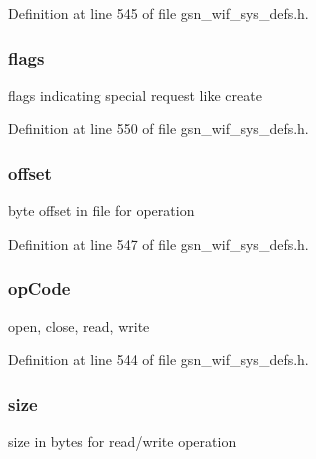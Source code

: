 Definition at line 545 of file gsn\_\-wif\_\-sys\_\-defs.h.

\hypertarget{a00350_a5a821be372043cabb6e452c3ce9bc068}{
\subsubsection[{flags}]{ {\bf flags}}}
\label{a00350_a5a821be372043cabb6e452c3ce9bc068}
flags indicating special request like create 

Definition at line 550 of file gsn\_\-wif\_\-sys\_\-defs.h.

\hypertarget{a00350_af7c1ea69079dc905761ed0a19ec036ab}{
\subsubsection[{offset}]{ {\bf offset}}}
\label{a00350_af7c1ea69079dc905761ed0a19ec036ab}
byte offset in file for operation 

Definition at line 547 of file gsn\_\-wif\_\-sys\_\-defs.h.

\hypertarget{a00350_adcf88f6496d374c89792872ab087189d}{
\subsubsection[{opCode}]{ {\bf opCode}}}
\label{a00350_adcf88f6496d374c89792872ab087189d}
open, close, read, write 

Definition at line 544 of file gsn\_\-wif\_\-sys\_\-defs.h.

\hypertarget{a00350_a68890417cb73114517d0d8c594bd282e}{
\subsubsection[{size}]{ {\bf size}}}
\label{a00350_a68890417cb73114517d0d8c594bd282e}
size in bytes for read/write operation 

